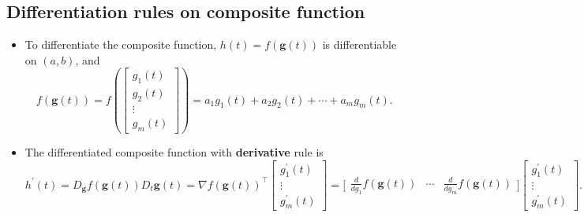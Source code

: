 \documentclass[12pt,thmsa]{article}
\begin{document}
\bigskip

\subsection{Differentiation rules on composite function}
\begin{itemize}
	\item To differentiate the composite function, \( h(t)=f(\boldsymbol{g}(t)) \) is differentiable on \((a, b)\), and
	\[
	f \left( \boldsymbol{g} \left( t \right) 	\right)=
	f \left( \left[
	\begin{array}{c}
		g_{1}( t ) \\
		g_{2}( t ) \\
		\vdots \\
		g_{m}( t )
	\end{array}
	\right]
	\right)
	= a_{1}g_{1}( t ) + a_{2}g_{2}( t ) + \cdots + a_{m}g_{m}( t ).
	\]

	\item The differentiated composite function with \textbf{derivative} rule is 
	\[
	h^{\prime}(t)=D_{\boldsymbol{g}} f(\boldsymbol{g}(t)) D_{t} \boldsymbol{g}(t)
	=\nabla f(\boldsymbol{g}(t))^{\top}
	\left[\begin{array}{c}
		g_{1}^{\prime}(t) \\
		\vdots \\
		g_{m}^{\prime}(t)
	\end{array}  \right] 
	=  \bigg[ \begin{array}{ccc}
		\frac{d}{d g_1} f(\boldsymbol{g}(t)) &
		\cdots &
		\frac{d}{d g_m} f(\boldsymbol{g}(t))
	\end{array} \bigg] \left[\begin{array}{c}
		g_{1}^{\prime}(t) \\
		\vdots \\
		g_{m}^{\prime}(t)
	\end{array}  \right]  .
	\]

%
	

\end{itemize}
\end{document}
